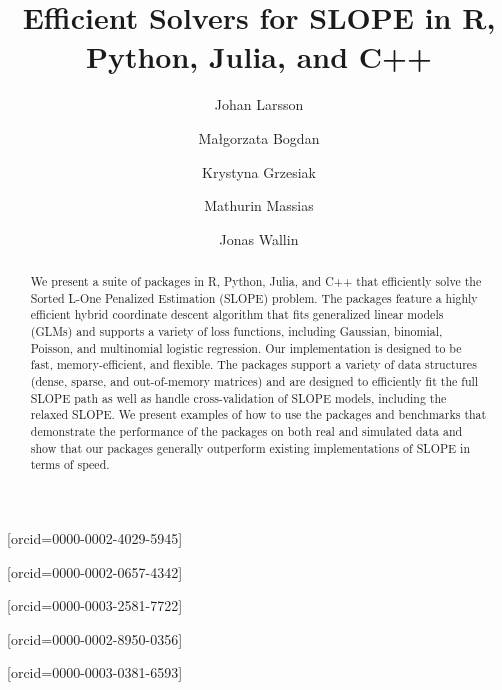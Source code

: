 \documentclass[a4paper,fleqn]{cas-sc}
\begin{document}

\title[mode=title]{Efficient Solvers for SLOPE in R, Python, Julia, and C++}

\author[1]{Johan Larsson}[orcid=0000-0002-4029-5945]
\cormark[1]
\author[2]{Ma\l{}gorzata Bogdan}[orcid=0000-0002-0657-4342]
\author[2]{Krystyna Grzesiak}[orcid=0000-0003-2581-7722]
\author[3]{Mathurin Massias}[orcid=0000-0002-8950-0356]
\author[4]{Jonas Wallin}[orcid=0000-0003-0381-6593]






\begin{abstract}
  We present a suite of packages in \textsf{R}, \textsf{Python}, \textsf{Julia},
  and \textsf{C++} that efficiently solve the Sorted L-One Penalized Estimation
  (SLOPE) problem. The packages feature a highly efficient hybrid coordinate
  descent algorithm that fits generalized linear models (GLMs) and supports a
  variety of loss functions, including Gaussian, binomial, Poisson, and
  multinomial logistic regression. Our implementation is designed to be fast,
  memory-efficient, and flexible. The packages support a variety of data
  structures (dense, sparse, and out-of-memory matrices) and are designed to
  efficiently fit the full SLOPE path as well as handle cross-validation of
  SLOPE models, including the relaxed SLOPE\@. We present examples of how to use
  the packages and benchmarks that demonstrate the performance of the packages
  on both real and simulated data and show that our packages generally
  outperform existing implementations of SLOPE in terms of speed.
\end{abstract}
\end{document}
